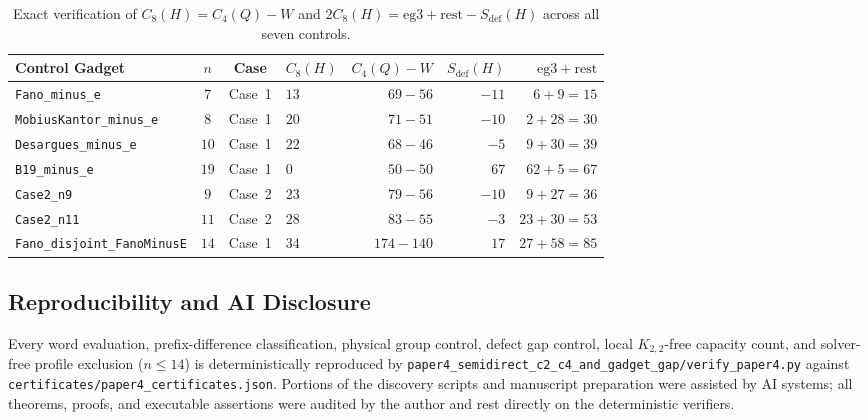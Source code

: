 \documentclass[11pt]{amsart}
\theoremstyle{definition}
\theoremstyle{remark}
\begin{document}
\begin{table}[htbp]
\centering
\caption{Exact verification of $C_8(H) = C_4(Q) - W$ and $2C_8(H) = \mathrm{eg3} + \mathrm{rest} - S_{\mathrm{def}}(H)$ across all seven controls.}\label{tab:defect_controls}
\small
\begin{tabular}{lcclrrr}
\toprule
Control Gadget & $n$ & Case & $C_8(H)$ & $C_4(Q) - W$ & $S_{\mathrm{def}}(H)$ & $\mathrm{eg3} + \mathrm{rest}$ \\
\midrule
\texttt{Fano\_minus\_e} & $7$ & Case~1 & $13$ & $69 - 56$ & $-11$ & $6 + 9 = 15$ \\
\texttt{MobiusKantor\_minus\_e} & $8$ & Case~1 & $20$ & $71 - 51$ & $-10$ & $2 + 28 = 30$ \\
\texttt{Desargues\_minus\_e} & $10$ & Case~1 & $22$ & $68 - 46$ & $-5$ & $9 + 30 = 39$ \\
\texttt{B19\_minus\_e} & $19$ & Case~1 & $0$ & $50 - 50$ & $67$ & $62 + 5 = 67$ \\
\texttt{Case2\_n9} & $9$ & Case~2 & $23$ & $79 - 56$ & $-10$ & $9 + 27 = 36$ \\
\texttt{Case2\_n11} & $11$ & Case~2 & $28$ & $83 - 55$ & $-3$ & $23 + 30 = 53$ \\
\texttt{Fano\_disjoint\_FanoMinusE} & $14$ & Case~1 & $34$ & $174 - 140$ & $17$ & $27 + 58 = 85$ \\
\bottomrule
\end{tabular}
\end{table}

\subsection*{Reproducibility and AI Disclosure}
Every word evaluation, prefix-difference classification, physical group control, defect gap control, local $K_{2,2}$-free capacity count, and solver-free profile exclusion ($n \le 14$) is deterministically reproduced by \texttt{paper4\_semidirect\_c2\_c4\_and\_gadget\_gap/verify\_paper4.py} against \texttt{certificates/paper4\_certificates.json}. Portions of the discovery scripts and manuscript preparation were assisted by AI systems; all theorems, proofs, and executable assertions were audited by the author and rest directly on the deterministic verifiers.
\end{document}
